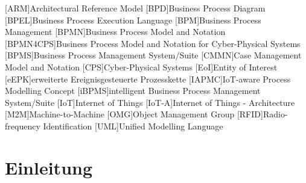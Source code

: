 \documentclass[a4paper, 12pt, twoside, headsepline=true]{scrartcl} %
\begin{document}
\tableofcontents
\clearpage
\newpage


\begin{acronym}[header=Abkürzungsverzeichnis]
	[ARM]{Architectural Reference Model}
	[BPD]{Business Process Diagram}
	[BPEL]{Business Process Execution Language}
	[BPM]{Business Process Management}
	[BPMN]{Business Process Model and Notation}
	[BPMN4CPS]{Business Process Model and Notation for Cyber-Physical Systems}
	[BPMS]{Business Process Management System/Suite}
	[CMMN]{Case Management Model and Notation}
	[CPS]{Cyber-Physical Systems}
	[EoI]{Entity of Interest}
	[eEPK]{erweiterte Ereignisgesteuerte Prozesskette}
	[IAPMC]{IoT-aware Process Modelling Concept}
	[iBPMS]{intelligent Business Process Management System/Suite}
	[IoT]{Internet of Things}
	[IoT-A]{Internet of Things - Architecture}
	[M2M]{Machine-to-Machine}
	[OMG]{Object Management Group}
	[RFID]{Radio-frequency Identification}
	[UML]{Unified Modelling Language}
\end{acronym}

\clearpage


\listoftables

\clearpage

\listoffigures
\clearpage


\section{Einleitung} \label{sec:section}

\end{document}
